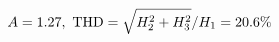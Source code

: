 \documentclass[preview]{standalone}
\begin{document}
\begin{align*}
\special{dvisvgm:raw <g id='unique000'>}A=1.27,\ \text{THD}=\sqrt{H_2^2+H_3^2}/H_1=20.6\%\special{dvisvgm:raw </g>}
\end{align*}
\end{document}
